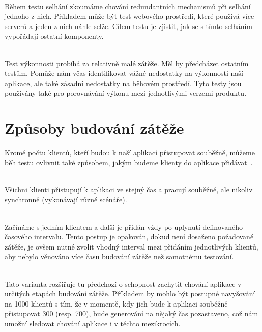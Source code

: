 \documentclass[122pt,oneside]{fithesis}
\begin{document}
\vspace{5 mm}
\\\indent Během testu selhání zkoumáme chování redundantních mechanismů při selhání jednoho z nich. Příkladem může být test webového prostředí, které používá více serverů a jeden z nich náhle selže. Cílem testu je zjistit, jak se s tímto selháním vypořádají ostatní komponenty.
 
\vspace{5 mm}
\\\indent Test výkonnosti probíhá za relativně malé zátěže. Měl by předcházet ostatním testům. Pomůže nám včas identifikovat vážné nedostatky na výkonnosti naší aplikace, ale také zásadní nedostatky na běhovém prostředí. Tyto testy jsou používány také pro porovnávání výkonu mezi jednotlivými verzemi produktu.

\section{Způsoby budování zátěže}

Kromě počtu klientů, kteří budou k naší aplikací přistupovat souběžně, můžeme běh testu ovlivnit také způsobem, jakým budeme klienty do aplikace přidávat~\cite{molyneaux09}.

\vspace{5 mm}
\\\indent Všichni klienti přistupují k aplikaci ve stejný čas a pracují souběžně, ale nikoliv synchronně (vykonávají různé scénáře).

\vspace{5 mm}
\\\indent Začínáme s jedním klientem a další je přidán vždy po uplynutí definovaného časového intervalu. Tento postup je opakován, dokud není dosaženo požadované zátěže, je ovšem nutné zvolit vhodný interval mezi přidáním jednotlivých klientů, aby nebylo věnováno více času budování zátěže než samotnému testování.

\vspace{5 mm}
\\\indent Tato varianta rozšiřuje tu předchozí o schopnost zachytit chování aplikace v určitých etapách budování zátěže. Příkladem by mohlo být postupné navyšování na 1000 klientů s tím, že v momentě, kdy jich bude k aplikaci souběžně přistupovat 300 (resp. 700), bude generování na nějaký čas pozastaveno, což nám umožní sledovat chování aplikace i v těchto mezikrocích.
\end{document}
